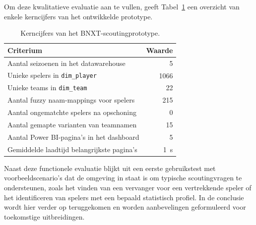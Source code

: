 Om deze kwalitatieve evaluatie aan te vullen, geeft Tabel~\ref{tab:kerncijfers-prototype} een overzicht van enkele kerncijfers van het ontwikkelde prototype.

\begin{table}[H]
    \centering
    \caption{Kerncijfers van het BNXT-scoutingprototype.}
    \label{tab:kerncijfers-prototype}
    \begin{tabular}{p{} r}
        \toprule
        \textbf{Criterium} & \textbf{Waarde} \\
        \midrule
        Aantal seizoenen in het datawarehouse
        & 5 \\

        Unieke spelers in \texttt{dim\_player}
        & 1066 \\

        Unieke teams in \texttt{dim\_team}
        & 22 \\

        Aantal fuzzy naam-mappings voor spelers
        & 215 \\

        Aantal ongematchte spelers na opschoning
        & 0 \\

        Aantal gemapte varianten van teamnamen
        & 15 \\

        Aantal Power BI-pagina's in het dashboard
        & 5 \\

        Gemiddelde laadtijd belangrijkste pagina's
        &  1~s \\
        \bottomrule
    \end{tabular}
\end{table}
 
Naast deze functionele evaluatie blijkt uit een eerste gebruikstest met voorbeeldscenario's dat de omgeving in staat is om typische scoutingvragen te ondersteunen, zoals het vinden van een vervanger voor een vertrekkende speler of het identificeren van spelers met een bepaald statistisch profiel. In de conclusie wordt hier verder op teruggekomen en worden aanbevelingen geformuleerd voor toekomstige uitbreidingen.